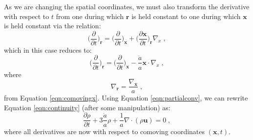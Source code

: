 \documentclass[twocolumn,superscriptaddress,prd]{revtex4}
\newcommand{\optionrule}{\noindent\rule{1.0\textwidth}{0.75pt}}
\newenvironment{aside}{%
  \def\FrameCommand{\hspace{2em}}
  \MakeFramed {\advance\hsize-\width \small}\optionrule}
{\newline\optionrule\endMakeFramed}
\begin{document}
As we are changing the spatial coordinates, we must also transform 
the derivative with respect to $t$ from
one during which $\mathbf{r}$ is held constant to one during which
$\mathbf{x}$ is held constant via the relation:
\begin{equation}
  \bigg(\frac{\partial}{\partial t} \bigg)_{\mathbf{r}} =
  \bigg(\frac{\partial}{\partial t} \bigg)_{\mathbf{x}} +\bigg(
  \frac{ \partial \mathbf{x} }{ \partial t} \bigg)_{\mathbf{r}}
  \nabla_x \;,
\end{equation}
which in this case reduces to:
\begin{equation}\label{eqn:partialconv}
  \bigg(\frac{\partial}{\partial t}\bigg)_{\mathbf{r}} = \bigg(\frac{\partial}{\partial
  t}\bigg)_{\mathbf{x}} - \frac{\dot{a} }{a} \mathbf{x}\cdot\nabla_x \;,
\end{equation}
where
\begin{equation}
  \nabla_{\mathbf{r}}=\frac{ \nabla_{\mathbf{x}}}{a} \;,
\end{equation}
from Equation \eqref{eqn:comovingx}.
Using Equation \eqref{eqn:partialconv}, we can rewrite Equation
\eqref{eqn:continuity} (after some manipulation) as:
\begin{equation}\label{eqn:continuity2}
  \frac{ \partial \rho }{ \partial t } + 3 \frac{\dot{a}}{a} \rho +
  \frac{1}{a} \nabla \cdot ( \rho \mathbf{u} ) = 0 \;,
\end{equation}
where all derivatives are now with respect to comoving coordinates $(\mathbf{x},t)$.

\end{document}
